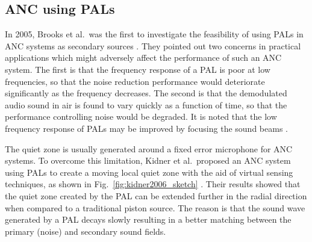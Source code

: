 \subsection{ANC using PALs}
\label{sec:review_anc_pal}
In 2005, Brooks et al.\ was the first to investigate the feasibility of using PALs in ANC systems as secondary sources \cite{Brooks2005InvestigationFeasibilityUsing}.
They pointed out two concerns in practical applications which might adversely affect the performance of such an ANC system.
The first is that the frequency response of a PAL is poor at low frequencies, so that the noise reduction performance would deteriorate significantly as the frequency decreases.
The second is that the demodulated audio sound in air is found to vary quickly as a function of time, so that the performance controlling  noise would be degraded.
{
It is noted that the low frequency response of PALs may be improved by focusing the sound beams \cite{Lucas1983FieldParametricFocusing, Saito1986SimpleAnalyticalModel, Saito1998ExperimentParametricFocusing, Cervenka2021ParametricAcousticArray}.
}

The quiet zone is usually generated around a fixed error microphone for ANC systems. 
To overcome this limitation, Kidner et al.\ proposed an ANC system using PALs to create a moving local quiet zone with the aid of virtual sensing techniques, as shown in Fig.~\ref{fig:kidner2006_sketch} \cite{Kidner2006FeasibilityStudyLocalised}.
Their results showed that the quiet zone created by the PAL can be extended further in the radial direction {when compared to} a traditional piston source. 
The reason is that the sound wave generated  by a PAL decays slowly resulting in a better matching between the primary (noise) and secondary sound fields.

